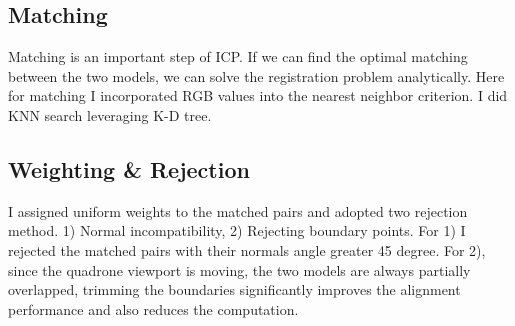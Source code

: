 \documentclass[letterpaper, 10 pt, conference]{ieeeconf}  %
\begin{document}
\subsection{Matching}

Matching is an important step of ICP. If we can find the optimal matching between the two models, we can solve the registration problem analytically. Here for matching I incorporated RGB values into the nearest neighbor criterion. I did KNN search leveraging K-D tree.\\

\subsection{Weighting \& Rejection}
I assigned uniform weights to the matched pairs and adopted two rejection method. 1) Normal incompatibility, 2) Rejecting boundary points. For 1) I rejected the matched pairs with their normals angle greater 45 degree. For 2), since the quadrone viewport is moving, the two models are always partially overlapped, trimming the boundaries significantly improves the alignment performance and also reduces the computation.\\
\end{document}
